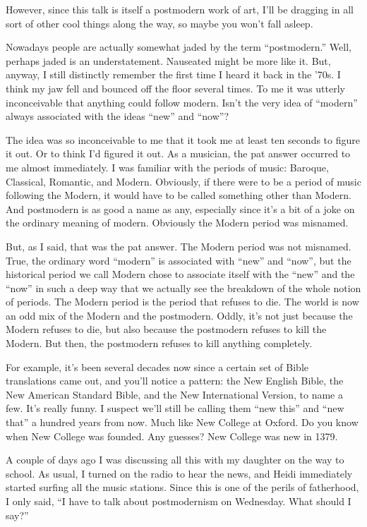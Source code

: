 However, since this talk is itself a postmodern work of art, I'll be dragging
in all sort of other cool things along the way, so maybe you won't fall
asleep.

Nowadays people are actually somewhat jaded by the term ``postmodern.''
Well, perhaps jaded is an understatement. Nauseated might be more like it.
But, anyway, I still distinctly remember the first time I heard it back in
the '70s. I think my jaw fell and bounced off the floor several times. To me
it was utterly inconceivable that anything could follow modern. Isn't the
very idea of ``modern'' always associated with the ideas ``new'' and
``now''?

The idea was so inconceivable to me that it took me at least ten seconds to
figure it out. Or to think I'd figured it out. As a musician, the pat answer
occurred to me almost immediately. I was familiar with the periods of music:
Baroque, Classical, Romantic, and Modern. Obviously, if there were to be a
period of music following the Modern, it would have to be called something
other than Modern. And postmodern is as good a name as any, especially since
it's a bit of a joke on the ordinary meaning of modern. Obviously the Modern
period was misnamed.

But, as I said, that was the pat answer. The Modern period was not misnamed.
True, the ordinary word ``modern'' is associated with ``new'' and
``now'', but the historical period we call Modern chose to associate itself
with the ``new'' and the ``now'' in such a deep way that we actually see
the breakdown of the whole notion of periods. The Modern period is the period
that refuses to die. The world is now an odd mix of the Modern and the
postmodern. Oddly, it's not just because the Modern refuses to die, but also
because the postmodern refuses to kill the Modern. But then, the postmodern
refuses to kill anything completely.

For example, it's been several decades now since a certain set of Bible
translations came out, and you'll notice a pattern: the New English Bible,
the New American Standard Bible, and the New International Version, to name a
few. It's really funny. I suspect we'll still be calling them ``new this''
and ``new that'' a hundred years from now. Much like New College at Oxford.
Do you know when New College was founded. Any guesses? New College was new in
1379.

A couple of days ago I was discussing all this with my daughter on the way to
school. As usual, I turned on the radio to hear the news, and Heidi
immediately started surfing all the music stations. Since this is one of the
perils of fatherhood, I only said, ``I have to talk about postmodernism on
Wednesday. What should I say?''

